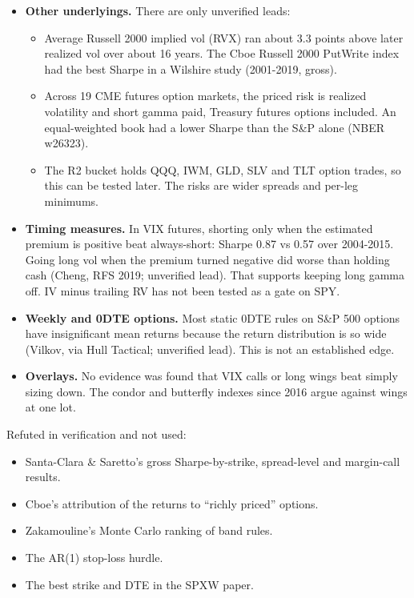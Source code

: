 \documentclass{article}
\begin{document}
\begin{itemize}

\item \textbf{Other underlyings.} There are only unverified leads:

\begin{itemize}

\item Average Russell 2000 implied vol (RVX) ran about 3.3 points above later realized vol over about 16 years. The Cboe Russell 2000 PutWrite index had the best Sharpe in a Wilshire study (2001-2019, gross).

\item Across 19 CME futures option markets, the priced risk is realized volatility and short gamma paid, Treasury futures options included. An equal-weighted book had a lower Sharpe than the S\&P alone (NBER w26323).

\item The R2 bucket holds QQQ, IWM, GLD, SLV and TLT option trades, so this can be tested later. The risks are wider spreads and per-leg minimums.

\end{itemize}

\item \textbf{Timing measures.} In VIX futures, shorting only when the estimated premium is positive beat always-short: Sharpe 0.87 vs 0.57 over 2004-2015. Going long vol when the premium turned negative did worse than holding cash (Cheng, RFS 2019; unverified lead). That supports keeping long gamma off. IV minus trailing RV has not been tested as a gate on SPY.

\item \textbf{Weekly and 0DTE options.} Most static 0DTE rules on S\&P 500 options have insignificant mean returns because the return distribution is so wide (Vilkov, via Hull Tactical; unverified lead). This is not an established edge.

\item \textbf{Overlays.} No evidence was found that VIX calls or long wings beat simply sizing down. The condor and butterfly indexes since 2016 argue against wings at one lot.

\end{itemize}

Refuted in verification and not used:

\begin{itemize}

\item Santa-Clara \& Saretto's gross Sharpe-by-strike, spread-level and margin-call results.

\item Cboe's attribution of the returns to ``richly priced'' options.

\item Zakamouline's Monte Carlo ranking of band rules.

\item The AR(1) stop-loss hurdle.

\item The best strike and DTE in the SPXW paper.

\end{itemize}
\end{document}
